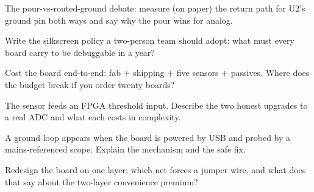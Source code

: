 \begin{exercise}[hard]
The pour-vs-routed-ground debate: measure (on paper) the return path
for U2's ground pin both ways and say why the pour wins for analog.
\end{exercise}
\begin{exercise}[hard]
Write the silkscreen policy a two-person team should adopt: what
must every board carry to be debuggable in a year?
\end{exercise}
\begin{exercise}[hard]
Cost the board end-to-end: fab + shipping + five sensors + passives.
Where does the budget break if you order twenty boards?
\end{exercise}
\begin{exercise}[hard]
The sensor feeds an FPGA threshold input. Describe the two honest
upgrades to a real ADC and what each costs in complexity.
\end{exercise}
\begin{exercise}[hard]
A ground loop appears when the board is powered by USB and probed
by a mains-referenced scope. Explain the mechanism and the safe
fix.
\end{exercise}
\begin{exercise}[hard]
Redesign the board on one layer: which net forces a jumper wire,
and what does that say about the two-layer convenience premium?
\end{exercise}

